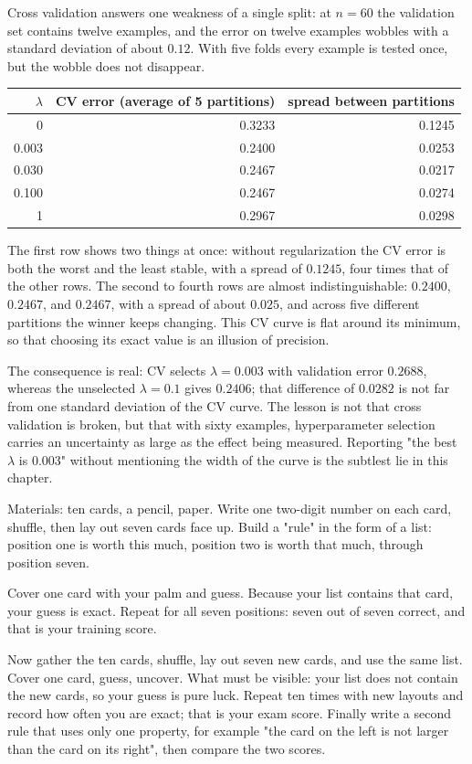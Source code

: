Cross validation answers one weakness of a single split: at $n=60$ the validation set
contains twelve examples, and the error on twelve examples wobbles with a standard
deviation of about $0.12$. With five folds every example is tested once, but the
wobble does not disappear.

\begin{center}
\small
\begin{tabular}{rrr}
\hline
$\lambda$ & CV error (average of 5 partitions) & spread between partitions \\
\hline
0     & 0.3233 & 0.1245 \\
0.003 & 0.2400 & 0.0253 \\
0.030 & 0.2467 & 0.0217 \\
0.100 & 0.2467 & 0.0274 \\
1     & 0.2967 & 0.0298 \\
\hline
\end{tabular}
\end{center}

The first row shows two things at once: without regularization the CV error is both
the worst and the least stable, with a spread of $0.1245$, four times that of the
other rows. The second to fourth rows are almost indistinguishable: $0.2400$,
$0.2467$, and $0.2467$, with a spread of about $0.025$, and across five different
partitions the winner keeps changing. This CV curve is flat around its minimum, so
that choosing its exact value is an illusion of precision.

The consequence is real: CV selects $\lambda=0.003$ with validation error $0.2688$,
whereas the unselected $\lambda=0.1$ gives $0.2406$; that difference of $0.0282$ is
not far from one standard deviation of the CV curve. The lesson is not that cross
validation is broken, but that with sixty examples, hyperparameter selection carries
an uncertainty as large as the effect being measured. Reporting "the best $\lambda$
is $0.003$" without mentioning the width of the curve is the subtlest lie in
this chapter.

\begin{tangan}
Materials: ten cards, a pencil, paper. Write one two-digit number on each card,
shuffle, then lay out seven cards face up. Build a "rule" in the form of a list:
position one is worth this much, position two is worth that much, through position
seven.

Cover one card with your palm and guess. Because your list contains that card, your
guess is exact. Repeat for all seven positions: seven out of seven correct, and that
is your training score.

Now gather the ten cards, shuffle, lay out seven new cards, and use the same list.
Cover one card, guess, uncover. What must be visible: your list does not contain the
new cards, so your guess is pure luck. Repeat ten times with new layouts and record
how often you are exact; that is your exam score. Finally write a second rule that
uses only one property, for example "the card on the left is not larger than the card
on its right", then compare the two scores.
\end{tangan}

